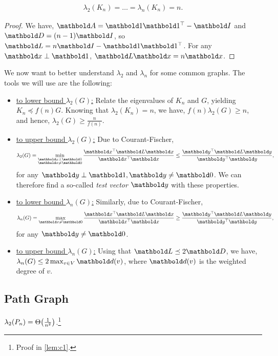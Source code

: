 \begin{lem} \begin{align}
    \lambda_2(K_n) = \dots = \lambda_n(K_n) = n.
\end{align}
\end{lem}
\begin{proof} We have, $\mA = \vOne\trans{\vOne} - \mI$ and $\mD = (n-1)\mI$, so $\mL = n\mI - \vOne\trans{\vOne}$. For any $\vx \perp \vOne$, $\mL\vx = n\vx$.
\end{proof}

We now want to better understand $\lambda_2$ and $\lambda_n$ for some common graphs. The tools we will use are the following: \begin{itemize}
    \item \underline{to lower bound $\lambda_2(G)$:} Relate the eigenvalues of $K_n$ and $G$, yielding $K_n \preceq f(n) G$. Knowing that $\lambda_2(K_n) = n$, we have, $f(n) \lambda_2(G) \geq n$, and hence, $\lambda_2(G) \geq \frac{n}{f(n)}$.
    \item \underline{to upper bound $\lambda_2(G)$:} Due to Courant-Fischer, \begin{align*}
        \lambda_2(G) = \min_{\substack{\vx \perp \vOne \\ \vx \neq \vZero}} \frac{\trans{\vx}\mL\vx}{\trans{\vx}\vx} \leq \frac{\trans{\vy}\mL\vy}{\trans{\vy}\vy},
    \end{align*} for any $\vy \perp \vOne, \vy \neq \vZero$. We can therefore find a so-called \emph{test vector} $\vy$ with these properties.
    \item \underline{to lower bound $\lambda_n(G)$:} Similarly, due to Courant-Fischer, \begin{align*}
        \lambda_n(G) = \max_{\vx \neq \vZero} \frac{\trans{\vx}\mL\vx}{\trans{\vx}\vx} \geq \frac{\trans{\vy}\mL\vy}{\trans{\vy}\vy},
    \end{align*} for any $\vy \neq \vZero$.
    \item \underline{to upper bound $\lambda_n(G)$:} Using that $\mL \preceq 2 \mD$, we have, $\lambda_n(G) \leq 2 \max_{v \in \sV} \vd(v)$, where $\vd(v)$ is the weighted degree of $v$.
\end{itemize}

\subsection{Path Graph}

\begin{lem}
$\lambda_2(P_n) = \Theta\parentheses*{\frac{1}{n^2}}$.\footnote{Proof in \cref{lem:c1}.}
\end{lem}

